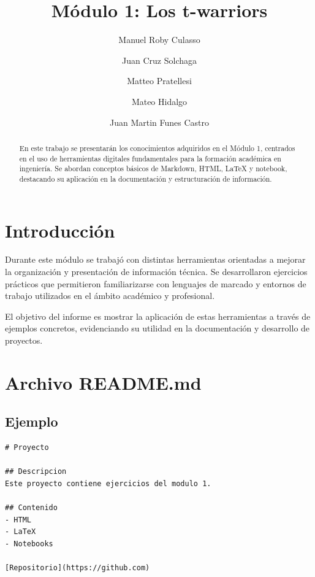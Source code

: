 \documentclass[runningheads]{llncs}
\begin{document}
\title{Módulo 1: Los t-warriors}

\author{Manuel Roby Culasso \and
Juan Cruz Solchaga \and
Matteo Pratellesi\and
Mateo Hidalgo\and
Juan Martin Funes Castro}
%

\maketitle

\begin{abstract}
En este trabajo se presentarán los conocimientos adquiridos en el Módulo 1, centrados en el uso de herramientas digitales fundamentales para la formación académica en ingeniería. Se abordan conceptos básicos de Markdown, HTML, LaTeX y notebook, destacando su aplicación en la documentación y estructuración de información.
\end{abstract}

\section{Introducción}

Durante este módulo se trabajó con distintas herramientas orientadas a mejorar la organización y presentación de información técnica. Se desarrollaron ejercicios prácticos que permitieron familiarizarse con lenguajes de marcado y entornos de trabajo utilizados en el ámbito académico y profesional.

El objetivo del informe es mostrar la aplicación de estas herramientas a través de ejemplos concretos, evidenciando su utilidad en la documentación y desarrollo de proyectos.

\section{Archivo README.md}

\subsection{Ejemplo}
\begin{lstlisting}[caption=Ejemplo de README.md]
# Proyecto

## Descripcion
Este proyecto contiene ejercicios del modulo 1.

## Contenido
- HTML
- LaTeX
- Notebooks

[Repositorio](https://github.com)
\end{lstlisting}
\end{document}
